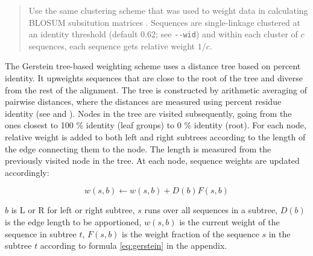 \begin{quote}
	Use the same clustering scheme that was used to weight data in calculating
	BLOSUM subsitution matrices \citep{henikoff1994}. Sequences are
	single-linkage clustered at an identity threshold (default 0.62; see
	\lstinline{--wid}) and within each cluster of $c$ sequences, each sequence
	gets relative weight $1/c$. 
\end{quote}

The Gerstein tree-based weighting scheme uses a distance tree based on percent
identity. It upweights sequences that are close to the root of the tree and
diverse from the rest of the alignment. The tree is constructed by arithmetic
averaging of pairwise distances, where the distances are measured using percent
residue identity (see \citet{nei1987} and \citet{sneath1973}). Nodes in the tree
are visited subsequently, going from the ones closest to 100 \% identity (leaf
groups) to 0 \% identity (root). For each node, relative weight is added to both
left and right subtrees according to the length of the edge connecting them to
the node. The length is measured from the previously visited node in the tree.
At each node, sequence weights are updated accordingly:

\begin{equation}
	w(s,b) \leftarrow w(s,b) + D(b)F(s,b)
	\label{eq:gerstein}
\end{equation}

$b$ is L or R for left or right subtree, $s$ runs over all sequences in a
subtree, $D(b)$ is the edge length to be apportioned, $w(s,b)$ is the current
weight of the sequence in subtree $t$, $F(s,b)$ is the weight fraction of the
sequence $s$ in the subtree $t$ according to formula \ref{eq:gerstein} in the
appendix.

